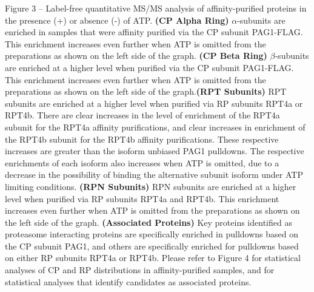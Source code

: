 Figure 3 – Label-free quantitative MS/MS analysis of affinity-purified proteins in the presence (+) or absence (-) of ATP. \textbf{(CP Alpha Ring)} $\alpha$-subunits are enriched in samples that were affinity purified via the CP subunit PAG1-FLAG. This enrichment increases even further when ATP is omitted from the preparations as shown on the left side of the graph. \textbf{(CP Beta Ring)} $\beta$-subunits are enriched at a higher level when purified via the CP subunit PAG1-FLAG. This enrichment increases even further when ATP is omitted from the preparations as shown on the left side of the graph.\textbf{(RPT Subunits)} RPT subunits are enriched at a higher level when purified via RP subunits RPT4a or RPT4b. There are clear increases in the level of enrichment of the RPT4a subunit for the RPT4a affinity purifications, and clear increases in enrichment of the RPT4b subunit for the RPT4b affinity purifications. These respective increases are greater than the isoform unbiased PAG1 pulldowns. The respective enrichments of each isoform also increases when ATP is omitted, due to a decrease in the possibility of binding the alternative subunit isoform under ATP limiting conditions. \textbf{(RPN Subunits)} RPN subunits are enriched at a higher level when purified via RP subunits RPT4a and RPT4b. This enrichment increases even further when ATP is omitted from the preparations as shown on the left side of the graph. \textbf{(Associated Proteins)} Key proteins identified as proteasome interacting proteins are specifically enriched in pulldowns based on the CP subunit PAG1, and others are specifically enriched for pulldowns based on either RP subunits RPT4a or RPT4b. Please refer to Figure 4 for statistical analyses of CP and RP distributions in affinity-purified samples, and for statistical analyses that identify candidates as associated proteins. 


